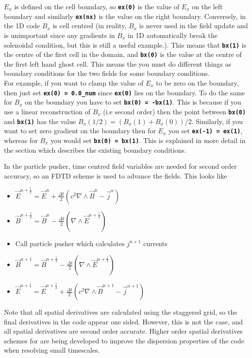 \documentclass[12pt,a4paper]{article}
\newcommand{\inlinecode}[1]{{\color{warwickred} \bf\texttt{#1}}}
\newcommand{\EPOCH}{{\color{warwickdark}\fontfamily{phv}\selectfont{EPOCH}}}
\begin{document}
$E_x$ is defined on the cell boundary, so \inlinecode{ex(0)} is the value of
$E_x$ on the left boundary and similarly \inlinecode{ex(nx)} is the
value on the right boundary. Conversely, in the 1D code $B_x$ is cell centred
(in reality, $B_x$ is never used in the field update and is unimportant since
any gradients in $B_x$ in 1D automatically break the solenoidal condition, but
this is still a useful example.). This means that \inlinecode{bx(1)} is the
centre of the first cell in the domain, and \inlinecode{bx(0)} is the value at
the centre of the first left hand ghost cell. This means the you must do
different things as boundary conditions for the two fields for some boundary
conditions.\\

For example, if you want to clamp the value of $E_x$ to be zero on the
boundary, then just set \inlinecode{ex(0) = 0.0\_num} since \inlinecode{ex(0)}
lies on the boundary. To do the same for $B_x$ on the boundary you have to
set \inlinecode{bx(0) = -bx(1)}. This is because if you use a linear
reconstruction of $B_x$ (i.e second order) then the point between
\inlinecode{bx(0)} and \inlinecode{bx(1)} has the value
$B_x(1/2) = \left(B_x(1)+B_x(0)\right)/2$. Similarly, if you want to set zero
gradient on the boundary then for $E_x$ you set \inlinecode{ex(-1) = ex(1)},
whereas for $B_x$ you would set \inlinecode{bx(0) = bx(1)}. This is explained
in more detail in the section which describes the existing {\EPOCH} boundary
conditions.

In the particle pusher, time centred field variables are needed for second
order accuracy, so an FDTD scheme is used to advance the fields. This looks
like

\begin{itemize}
\item $\vec{E}^{n+\frac{1}{2}} = \vec{E}^n + \frac{\Delta t}{2} \left( c^2
  \nabla \wedge \vec{B}^{n} -\vec{j}^{n} \right)$
\item $\vec{B}^{n+\frac{1}{2}} = \vec{B}^n - \frac{\Delta t}{2} \left( \nabla
  \wedge \vec{E}^{n+\frac{1}{2}} \right)$
\item Call particle pusher which calculates $j^{n+1}$ currents
\item $\vec{B}^{n+1} = \vec{B}^{n+\frac{1}{2}} - \frac{\Delta t}{2} \left(
  \nabla \wedge \vec{E}^{n+\frac{1}{2}} \right)$
\item $\vec{E}^{n+1} = \vec{E}^{n+\frac{1}{2}} + \frac{\Delta t}{2} \left( c^2
  \nabla \wedge \vec{B} ^{n+1} - \vec{j}^{n+1} \right)$
\end{itemize}
Note that all spatial derivatives are calculated using the staggered grid, so
the final derivatives in the code appear one sided. However, this is not the
case, and all spatial derivatives are second order accurate. Higher order
spatial derivatives schemes for {\EPOCH} are being developed to improve the
dispersion properties of the code when resolving small timescales.
\end{document}
